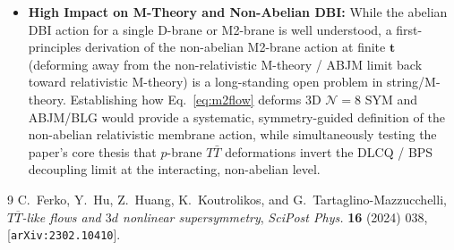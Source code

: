 \documentclass[11pt,a4paper]{article}
\begin{document}
\begin{itemize}
    \item \textbf{High Impact on M-Theory and Non-Abelian DBI:} While the abelian DBI action for a single D-brane or M2-brane is well understood, a first-principles derivation of the non-abelian M2-brane action at finite $\boldsymbol{t}$ (deforming away from the non-relativistic M-theory / ABJM limit back toward relativistic M-theory) is a long-standing open problem in string/M-theory. Establishing how Eq.~\eqref{eq:m2flow} deforms 3D $\mathcal{N}=8$ SYM and ABJM/BLG would provide a systematic, symmetry-guided definition of the non-abelian relativistic membrane action, while simultaneously testing the paper's core thesis that $p$-brane $T\bar{T}$ deformations invert the DLCQ / BPS decoupling limit at the interacting, non-abelian level.
\end{itemize}

\begin{thebibliography}{9}
C.~Ferko, Y.~Hu, Z.~Huang, K.~Koutrolikos, and G.~Tartaglino-Mazzucchelli, \emph{{$T \overline{T}$-like flows and $3d$ nonlinear supersymmetry}}, \emph{SciPost Phys.} \textbf{16} (2024) 038, [\texttt{arXiv:2302.10410}].
\end{thebibliography}
\end{document}
